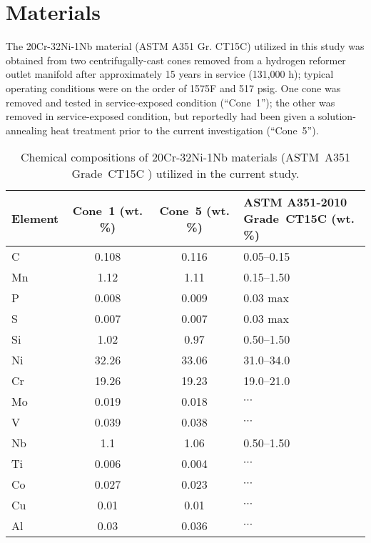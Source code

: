 \chapter{Materials}\label{ch:materials}
The 20Cr-32Ni-1Nb material (ASTM A351 Gr. CT15C) utilized in this study was obtained from two centrifugally-cast cones removed from a hydrogen reformer outlet manifold after approximately 15 years in service (131,000 h); typical operating conditions were on the order of 1575\textdegree{}F and 517 psig.  One cone was removed and tested in service-exposed condition (``Cone~1''); the other was removed in service-exposed condition, but reportedly had been given a solution-annealing heat treatment prior to the current investigation (``Cone~5'').

\begin{table}
\caption{Chemical compositions of 20Cr-32Ni-1Nb materials (ASTM~A351 Grade~CT15C \cite{astm_a351_2010}) utilized in the current study.}
\begin{tabular}{l c c C{2in}}
\toprule
\textbf{Element} & \textbf{Cone~1 (wt. \%)} & \textbf{Cone~5 (wt. \%)} & \textbf{ASTM A351-2010 \newline Grade~CT15C (wt. \%)}\\
\midrule
C  & 0.108    & 0.116    & 0.05--0.15           \\
Mn & 1.12     & 1.11     & 0.15--1.50           \\
P  & 0.008    & 0.009    & 0.03 max            \\
S  & 0.007    & 0.007    & 0.03 max            \\
Si & 1.02     & 0.97     & 0.50--1.50           \\
Ni & 32.26    & 33.06    & 31.0--34.0           \\
Cr & 19.26    & 19.23    & 19.0--21.0           \\
Mo & 0.019    & 0.018    & $\cdots$                   \\
V  & 0.039    & 0.038    & $\cdots$                   \\
Nb & 1.1      & 1.06     & 0.50--1.50                  \\
Ti & 0.006    & 0.004    & $\cdots$                   \\
Co & 0.027    & 0.023    & $\cdots$           \\
Cu & 0.01     & 0.01     & $\cdots$                   \\
Al & 0.03     & 0.036    & $\cdots$                   \\

\end{tabular}
\end{table}
